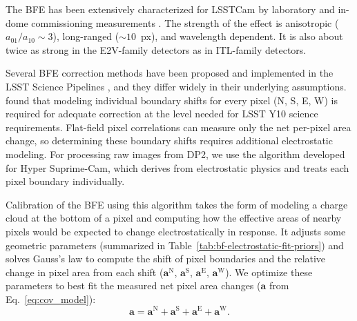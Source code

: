 The BFE has been extensively characterized for LSSTCam by laboratory and in-dome commissioning measurements \citep{2024PASP..136d5003B}.
The strength of the effect is anisotropic ($a_{01}/a_{10} \sim 3$), long-ranged ($\sim 10$~px), and wavelength dependent.
It is also about twice as strong in the E2V-family detectors as in ITL-family detectors.

Several BFE correction methods have been proposed and implemented in the LSST Science Pipelines \citep{2015JInst..10C5032G,2018AJ....155..258C,2023A&A...670A.118A,2024PASP..136d5003B}, and they differ widely in their underlying assumptions.
\citet{2024PASP..136d5003B} found that modeling individual boundary shifts for every pixel (N, S, E, W) is required for adequate correction at the level needed for LSST Y10 science requirements.
Flat-field pixel correlations can measure only the net per-pixel area change, so determining these boundary shifts requires additional electrostatic modeling.
For processing raw images from DP2, we use the \citet{2023A&A...670A.118A} algorithm developed for Hyper Suprime-Cam, which derives from electrostatic physics and treats each pixel boundary individually.



Calibration of the BFE using this algorithm takes the form of modeling a charge cloud at the bottom of a pixel and computing
how the effective areas of nearby pixels would be expected to change electrostatically in response. It adjusts some geometric parameters (summarized in Table~\ref{tab:bf-electrostatic-fit-priors}) and solves
Gauss's law to compute the shift of pixel boundaries and the relative change in pixel area from each shift ($\mathbf{a}^{\mathrm{N}}$,
$\mathbf{a}^{\mathrm{S}}$, $\mathbf{a}^{\mathrm{E}}$, $\mathbf{a}^{\mathrm{W}}$).
We optimize these parameters to best fit the
measured net pixel area changes ($\mathbf{a}$ from Eq.~\ref{eq:cov_model}):
\begin{equation}
    \mathbf{a} = \mathbf{a}^{\mathrm{N}} + \mathbf{a}^{\mathrm{S}} + \mathbf{a}^{\mathrm{E}} + \mathbf{a}^{\mathrm{W}}.
\end{equation}

